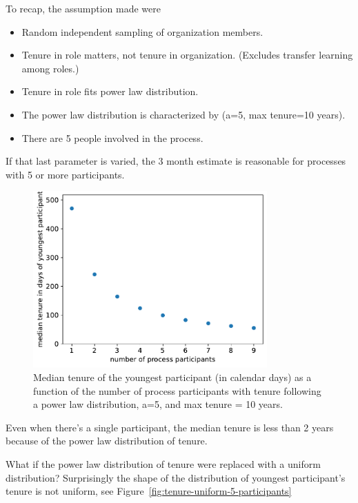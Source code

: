 To recap, the assumption made were
\begin{itemize}
    \item Random independent sampling of organization members. 
    \item Tenure in role matters, not tenure in organization. (Excludes transfer learning among roles.)
    \item Tenure in role fits power law distribution.
    \item The power law distribution is characterized by (a=5, max tenure=10 years). 
    \item There are 5 people involved in the process.
\end{itemize}
If that last parameter is varied, the 3 month estimate is reasonable for processes with 5 or more participants.

\begin{figure}[H]
    \centering
    \includegraphics[width=0.8\textwidth]{images/tenure_power_distribution_a5_with_max_tenure10.pdf}
    \caption{Median tenure of the youngest participant (in calendar days) as a function of the number of process participants with tenure following a power law distribution, a=5, and max tenure = 10 years.}
    \label{fig:tenure-powerlaw-5-participants}
\end{figure}


Even when there's a single participant, the median tenure is less than 2 years because of the power law distribution of tenure.

What if the power law distribution of tenure were replaced with a uniform distribution?
Surprisingly the shape of the distribution of youngest participant's tenure is not uniform, see Figure~\ref{fig:tenure-uniform-5-participants}

